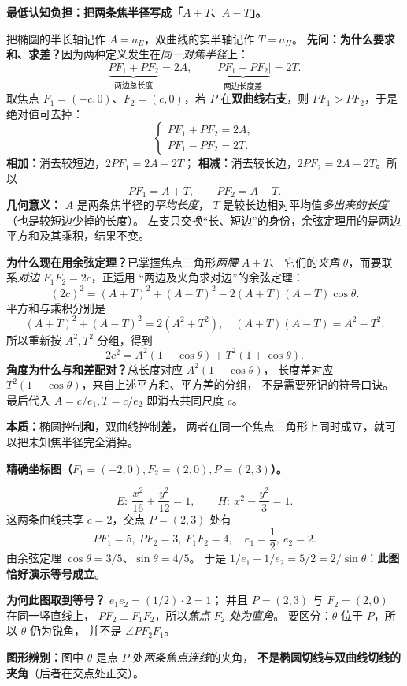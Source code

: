 \clearpage
\begin{explanationbox}
	\textbf{最低认知负担：把两条焦半径写成「$A+T$、$A-T$」。}

	
\begin{center}

\end{center}
把椭圆的半长轴记作 $A=a_E$，双曲线的实半轴记作 $T=a_H$。
\textbf{先问：为什么要求和、求差？}因为两种定义发生在\emph{同一对焦半径}上：
\[
\underbrace{PF_1+PF_2}_{\text{两边总长度}}=2A,\qquad
\underbrace{|PF_1-PF_2|}_{\text{两边长度差}}=2T.
\]
取焦点 $F_1=(-c,0)$、$F_2=(c,0)$，若 $P$ 在\textbf{双曲线右支}，则
$PF_1>PF_2$，于是绝对值可去掉：
\[
\begin{cases}
PF_1+PF_2=2A,\\
PF_1-PF_2=2T.
\end{cases}
\]
\textbf{相加：}消去较短边，$2PF_1=2A+2T$；
\textbf{相减：}消去较长边，$2PF_2=2A-2T$。所以
\[
\boxed{PF_1=A+T},\qquad \boxed{PF_2=A-T}.
\]
\textbf{几何意义：} $A$ 是两条焦半径的\emph{平均长度}，
$T$ 是较长边相对平均值\emph{多出来的长度}（也是较短边少掉的长度）。
左支只交换“长、短边”的身份，余弦定理用的是两边平方和及其乘积，结果不变。

	\textbf{为什么现在用余弦定理？}已掌握焦点三角形\emph{两腰} $A\pm T$、
它们的\emph{夹角} $\theta$，而要联系\emph{对边} $F_1F_2=2c$，正适用
“两边及夹角求对边”的余弦定理：
\[
(2c)^2=(A+T)^2+(A-T)^2-2(A+T)(A-T)\cos\theta.
\]
平方和与乘积分别是
\[
(A+T)^2+(A-T)^2=2(A^2+T^2),\quad
(A+T)(A-T)=A^2-T^2.
\]
所以重新按 $A^2,T^2$ 分组，得到
\[
2c^2=A^2(1-\cos\theta)+T^2(1+\cos\theta).
\]
\textbf{角度为什么与和差配对？}总长度对应 $A^2(1-\cos\theta)$，
长度差对应 $T^2(1+\cos\theta)$，来自上述平方和、平方差的分组，
不是需要死记的符号口诀。最后代入 $A=c/e_1,T=c/e_2$ 即消去共同尺度 $c$。

	\textbf{本质：}椭圆控制\textbf{和}，双曲线控制\textbf{差}，
	两者在同一个焦点三角形上同时成立，就可以把未知焦半径完全消掉。
\end{explanationbox}

\clearpage
\begin{explanationbox}
	\textbf{精确坐标图（$F_1=(-2,0),F_2=(2,0),P=(2,3)$）。}
	\begin{center}
		
	\end{center}
	\[
		E:\ \frac{x^2}{16}+\frac{y^2}{12}=1,\qquad
		H:\ x^2-\frac{y^2}{3}=1.
	\]
	这两条曲线共享 $c=2$，交点 $P=(2,3)$ 处有
	\[
		PF_1=5,\ PF_2=3,\ F_1F_2=4,\quad e_1=\frac12,\ e_2=2.
	\]
	由余弦定理 $\cos\theta=3/5$、$\sin\theta=4/5$。
	于是 $1/e_1+1/e_2=5/2=2/\sin\theta$：\textbf{此图恰好演示等号成立}。

	\textbf{为何此图取到等号？} $e_1e_2=(1/2)\cdot2=1$；
并且 $P=(2,3)$ 与 $F_2=(2,0)$ 在同一竖直线上，
$PF_2\perp F_1F_2$，所以\emph{焦点 $F_2$ 处为直角}。
要区分：$\theta$ 位于 $P$，所以 $\theta$ 仍为锐角，
并不是 $\angle PF_2F_1$。

\textbf{图形辨别：}图中 $\theta$ 是点 $P$ 处\emph{两条焦点连线}的夹角，
\textbf{不是椭圆切线与双曲线切线的夹角}（后者在交点处正交）。
\end{explanationbox}

